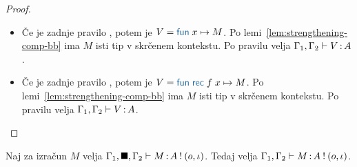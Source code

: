 \begin{proof}
\begin{itemize}
		\item Če je zadnje pravilo , potem je $V = \tmfunano{x}{M}$.
		Po lemi~\ref{lem:strengthening-comp-bb} ima $M$ isti tip v skrčenem kontekstu.
		Po pravilu  velja $\Gamma_1, \Gamma_2 \vdash V \mathinner{:} A$.
		
		\item Če je zadnje pravilo , potem je $V = \tmfunrecano{f}{x}{M}$.
		Po lemi~\ref{lem:strengthening-comp-bb} ima $M$ isti tip v skrčenem kontekstu.
		Po pravilu  velja $\Gamma_1, \Gamma_2 \vdash V \mathinner{:} A$.
		
	\end{itemize}
\end{proof}

\begin{lema}\label{lem:strengthening-comp-bb}
	Naj za izračun $M$ velja $\Gamma_1, \blacksquare, \Gamma_2 \vdash M \mathinner{:} A \mathbin{!} (o, \iota)$. Tedaj velja $\Gamma_1, \Gamma_2 \vdash M \mathinner{:} A \mathbin{!} (o, \iota)$.
\end{lema}


